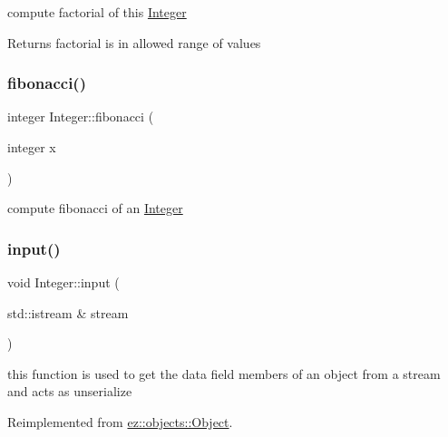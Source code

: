 compute factorial of this \hyperlink{classez_1_1objects_1_1Integer}{Integer} \begin{DoxyReturn}{Returns}
factorial is in allowed range of values 
\end{DoxyReturn}
\mbox{\label{classez_1_1objects_1_1Integer_ad85fb9d0675b07672d5dc9a8903e855c}} 
\subsubsection{\texorpdfstring{fibonacci()}{fibonacci()}}
{\footnotesize\ttfamily integer Integer\+::fibonacci (\begin{DoxyParamCaption}\item[{integer}]{x }\end{DoxyParamCaption})\hspace{0.3cm}{\ttfamily [static]}}

compute fibonacci of an \hyperlink{classez_1_1objects_1_1Integer}{Integer} \mbox{\label{classez_1_1objects_1_1Integer_af465d88d1b132f7131be7b29aadc5a8f}} 
\subsubsection{\texorpdfstring{input()}{input()}}
{\footnotesize\ttfamily void Integer\+::input (\begin{DoxyParamCaption}\item[{std\+::istream \&}]{stream }\end{DoxyParamCaption})\hspace{0.3cm}{\ttfamily [virtual]}}

this function is used to get the data field members of an object from a stream and acts as unserialize 

Reimplemented from \hyperlink{classez_1_1objects_1_1Object_a878bdc53b7f16fda6fa15dab214c4b6a}{ez\+::objects\+::\+Object}.

\mbox{\label{classez_1_1objects_1_1Integer_a8b35ec8937520b2227650aa489427bcd}} 
